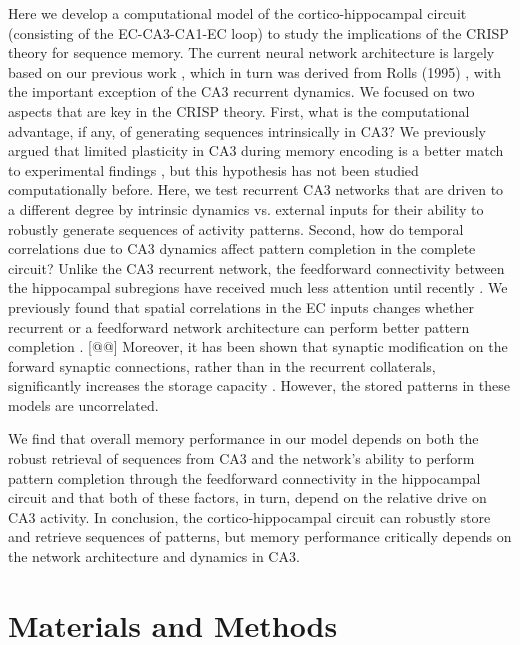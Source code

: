 \documentclass[utf8]{frontiersSCNS} %
\begin{document}
Here we develop a computational model of the cortico-hippocampal circuit (consisting of the EC-CA3-CA1-EC loop) to study the implications of the CRISP theory for sequence memory. The current neural network architecture is largely based on our previous work \citep{neher2015memory}, which in turn was derived from Rolls (1995) \citep{fontanari1995model}, with the important exception of the CA3 recurrent dynamics. We focused on two aspects that are key in the CRISP theory.
%
First, what is the computational advantage, if any, of generating sequences intrinsically in CA3? We previously argued that limited plasticity in CA3 during memory encoding is a better match to experimental findings \citep{cheng2013crisp,azizi2013computational}, but this hypothesis has not been studied computationally before. Here, we test recurrent CA3 networks that are driven to a different degree by intrinsic dynamics vs. external inputs for their ability to robustly generate sequences of activity patterns. 
%
Second, how do temporal correlations due to CA3 dynamics affect pattern completion in the complete circuit?  Unlike the CA3 recurrent network, the feedforward connectivity between the hippocampal subregions \citep{amaral1990chapter} have received much less attention until recently \citep{neher2015memory, pyka2014pattern}. We previously found that spatial correlations in the EC inputs changes whether recurrent or a feedforward network architecture can perform better pattern completion \citep{neher2015memory}. 
%
[@@] Moreover, it has been shown that synaptic modification on the forward synaptic connections, rather than in the recurrent collaterals, significantly increases the storage capacity \citep{willshaw1990assessment, willshaw1969non}. However, the stored patterns in these models are uncorrelated.   
%

We find that overall memory performance in our model depends on both the robust retrieval of sequences from CA3 and the network’s ability to perform pattern completion through the feedforward connectivity in the hippocampal circuit and that both of these factors, in turn, depend on the relative drive on CA3 activity.
%
In conclusion, the cortico-hippocampal circuit can robustly store and retrieve sequences of patterns, but memory performance critically depends on the network architecture and dynamics in CA3. 
%

  



\section{Materials and Methods}
\end{document}
